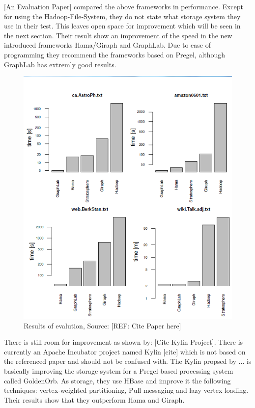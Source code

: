 \documentclass{acm_proc_article-sp}
\begin{document}
[An Evaluation Paper] compared the above frameworks in performance. Except for using the Hadoop-File-System, they do not state what storage system they use in their test. This leaves open space for improvement which will be seen in the next section. Their result show an improvement of the speed in the new introduced frameworks Hama/Giraph and GraphLab. Due to ease of programming they recommend the frameworks based on Pregel, although GraphLab has extremly good results.

\begin{figure}[hbtp]
	\centering
	\includegraphics[scale=0.5]{results_four.png}
	\caption{Results of evalution, Source: [REF: Cite Paper here]}
\end{figure}

There is still room for improvement as shown by: [Cite Kylin Project]. There is currently an Apache Incubator project named Kylin [cite] which is not based on the referenced paper and should not be confused with. The Kylin propsed by ... is basically improving the storage system for a Pregel based processing system called GoldenOrb. As storage, they use HBase and improve it the following techniques: vertex-weighted partitioning, Pull messaging and lazy vertex loading. Their results show that they outperform Hama and Giraph.
\end{document}
